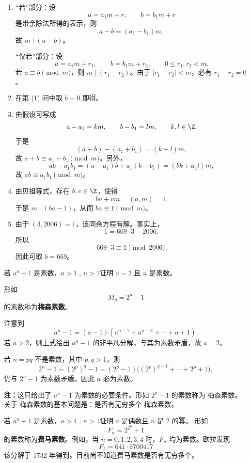 \begin{solution}
	\begin{enumerate}
		\item “若”部分：设
		\[
		a=a_1m+r,
		\qquad b=b_1m+r
		\]
		是带余除法所得的表示，则
		\[
		a-b=(a_1-b_1)m,
		\]
		故 \(m\mid(a-b)\)。
		
		“仅若”部分：设
		\[
		a=a_1m+r_1,
		\qquad b=b_1m+r_2,
		\qquad 0\le r_1,r_2<m.
		\]
		若 \(a\equiv b\pmod m\)，则 \(m\mid(r_1-r_2)\)。由于 \(|r_1-r_2|<m\)，必有 \(r_1-r_2=0\)。
		
		\item 在第 (1) 问中取 \(b=0\) 即得。
		
		\item 由假设可写成
		\[
		a-a_1=km,
		\qquad b-b_1=lm,
		\qquad k,l\in\Z.
		\]
		于是
		\[
		(a+b)-(a_1+b_1)=(k+l)m,
		\]
		故 \(a+b\equiv a_1+b_1\pmod m\)。另外，
		\[
		ab-a_1b_1=(a-a_1)b+a_1(b-b_1)=(bk+a_1l)m,
		\]
		故 \(ab\equiv a_1b_1\pmod m\)。
		
		\item 由贝祖等式，存在 \(b,v\in\Z\)，使得
		\[
		ba+vm=(a,m)=1.
		\]
		于是 \(m\mid(ba-1)\)，从而 \(ba\equiv1\pmod m\)。
		
		\item 由于 \((3,2006)=1\)，该同余方程有解。事实上，
		\[
		1=669\cdot3-2006,
		\]
		所以
		\[
		669\cdot3\equiv1\pmod{2006}.
		\]
		因此可取 \(b=669\)。
	\end{enumerate}
\end{solution}

\begin{problem}
若 \(a^n-1\) 是素数，\(a>1\) , \(n>1\)证明 \(a=2\) 且 \(n\) 是素数。

\end{problem}
	形如
\[
M_p=2^p-1
\]
\label{p1:concept:c1-l1974}的素数称为\textbf{梅森素数}。
\begin{solution}
	
	
	注意到
	\[
	a^n-1=(a-1)(a^{n-1}+a^{n-2}+\cdots+a+1).
	\]
	若 \(a>2\)，则上式给出 \(a^n-1\) 的非平凡分解，与其为素数矛盾，故 \(a=2\)。
	
	若 \(n=pq\) 不是素数，其中 \(p,q>1\)，则
	\[
	2^n-1=(2^p)^q-1
	=(2^p-1)\bigl((2^p)^{q-1}+\cdots+2^p+1\bigr),
	\]
	仍与 \(2^n-1\) 为素数矛盾。因此 \(n\) 必为素数。
	
	
\end{solution}
\textbf{注：}这只给出了 \(a^n-1\) 为素数的必要条件。形如 \(2^p-1\) 的素数称为 梅森素数。关于 梅森素数的基本问题是：是否有无穷多个 梅森素数。
\begin{problem}
若 \(a^n+1\) 是素数，\(a>1\) , \(n>1\)证明 \(a\) 是偶数且 \(n\) 是 \(2\) 的幂。
	形如
	\[
	F_n=2^{2^n}+1
	\]
	\label{p1:concept:c1-l2000}的素数称为\textbf{费马素数}。例如，当 \(n=0,1,2,3,4\) 时，\(F_n\) 均为素数。欧拉发现
	\[
	F_5=641\cdot6700417
	\]
	该分解于 1732 年得到。目前尚不知道费马素数是否有无穷多个。
\end{problem}

